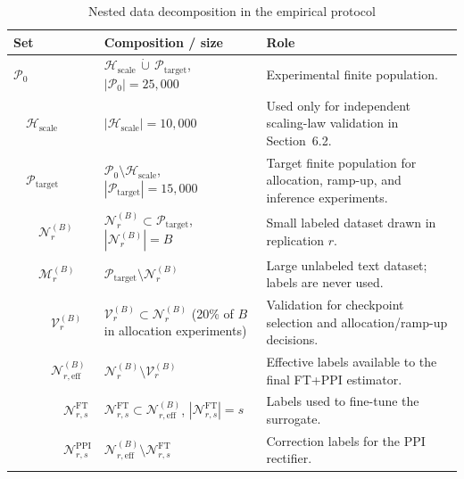 \documentclass[11pt]{article}
\begin{document}
\begin{table}[H]
\centering
\caption{Nested data decomposition in the empirical protocol}
\label{tab:label_accounting}
\footnotesize
\setlength{\tabcolsep}{5pt}
\renewcommand{\arraystretch}{1.13}
\begin{tabularx}{\textwidth}{@{}p{}p{}X@{}}
\toprule
Set & Composition / size & Role \\
\midrule
$\mathcal{P}_0$ &
$\mathcal{H}_{\mathrm{scale}}\,\dot\cup\,\mathcal{P}_{\mathrm{target}}$,
$|\mathcal{P}_0|=25{,}000$ &
Experimental finite population. \\
\addlinespace[0.15em]
$\quad\mathcal{H}_{\mathrm{scale}}$ &
$|\mathcal{H}_{\mathrm{scale}}|=10{,}000$ &
Used only for independent scaling-law validation in Section~6.2. \\
\addlinespace[0.15em]
$\quad\mathcal{P}_{\mathrm{target}}$ &
$\mathcal{P}_0\setminus\mathcal{H}_{\mathrm{scale}}$,
$|\mathcal{P}_{\mathrm{target}}|=15{,}000$ &
Target finite population for allocation, ramp-up, and inference experiments. \\
\midrule
$\quad\quad\mathcal{N}_r^{(B)}$ &
$\mathcal{N}_r^{(B)}\subset\mathcal{P}_{\mathrm{target}}$,
$|\mathcal{N}_r^{(B)}|=B$ &
Small labeled dataset drawn in replication $r$. \\
\addlinespace[0.15em]
$\quad\quad\mathcal{M}_r^{(B)}$ &
$\mathcal{P}_{\mathrm{target}}\setminus\mathcal{N}_r^{(B)}$ &
Large unlabeled text dataset; labels are never used. \\
\midrule
$\quad\quad\quad\mathcal{V}_r^{(B)}$ &
$\mathcal{V}_r^{(B)}\subset\mathcal{N}_r^{(B)}$
(20\% of $B$ in allocation experiments) &
Validation for checkpoint selection and allocation/ramp-up decisions. \\
\addlinespace[0.15em]
$\quad\quad\quad\mathcal{N}_{r,\mathrm{eff}}^{(B)}$ &
$\mathcal{N}_r^{(B)}\setminus\mathcal{V}_r^{(B)}$ &
Effective labels available to the final FT+PPI estimator. \\
\midrule
$\quad\quad\quad\quad\mathcal{N}_{r,s}^{\mathrm{FT}}$ &
$\mathcal{N}_{r,s}^{\mathrm{FT}}\subset
\mathcal{N}_{r,\mathrm{eff}}^{(B)}$,
$|\mathcal{N}_{r,s}^{\mathrm{FT}}|=s$ &
Labels used to fine-tune the surrogate. \\
\addlinespace[0.15em]
$\quad\quad\quad\quad\mathcal{N}_{r,s}^{\mathrm{PPI}}$ &
$\mathcal{N}_{r,\mathrm{eff}}^{(B)}
\setminus\mathcal{N}_{r,s}^{\mathrm{FT}}$ &
Correction labels for the PPI rectifier. \\
\bottomrule
\end{tabularx}
\end{table}
\end{document}
